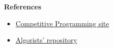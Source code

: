 \documentclass[article]{beamer}
\begin{document}
\begin{frame}[plain]
\frametitle{}
\begin{center}
\Huge{\color{blue}{Q \& A}}
\end{center}
\end{frame}

\begin{frame}[plain]
	\textbf{References}
	\begin{itemize}
		\item \href{https://sites.google.com/site/stevenhalim/}{Competitive Programming site}
		\item \href{https://github.com/davidjacobo/algorists/}{Algorists' repository}
	\end{itemize}
\end{frame}
\end{document}
